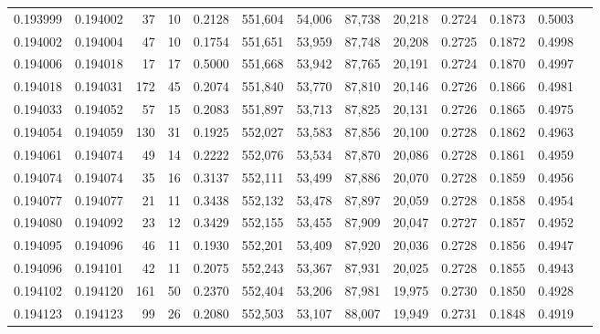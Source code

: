 \begin{tabular}{rrrrrrrrrrrrr}
0.193999 & 0.194002 &    37 &  10 &                                     0.2128 & 551,604 &  54,006 &  87,738 &  20,218 & 0.2724 & 0.1873 & 0.5003 \\
0.194002 & 0.194004 &    47 &  10 &                                     0.1754 & 551,651 &  53,959 &  87,748 &  20,208 & 0.2725 & 0.1872 & 0.4998 \\
0.194006 & 0.194018 &    17 &  17 &                                     0.5000 & 551,668 &  53,942 &  87,765 &  20,191 & 0.2724 & 0.1870 & 0.4997 \\
0.194018 & 0.194031 &   172 &  45 &                                     0.2074 & 551,840 &  53,770 &  87,810 &  20,146 & 0.2726 & 0.1866 & 0.4981 \\
0.194033 & 0.194052 &    57 &  15 &                                     0.2083 & 551,897 &  53,713 &  87,825 &  20,131 & 0.2726 & 0.1865 & 0.4975 \\
0.194054 & 0.194059 &   130 &  31 &                                     0.1925 & 552,027 &  53,583 &  87,856 &  20,100 & 0.2728 & 0.1862 & 0.4963 \\
0.194061 & 0.194074 &    49 &  14 &                                     0.2222 & 552,076 &  53,534 &  87,870 &  20,086 & 0.2728 & 0.1861 & 0.4959 \\
0.194074 & 0.194074 &    35 &  16 &                                     0.3137 & 552,111 &  53,499 &  87,886 &  20,070 & 0.2728 & 0.1859 & 0.4956 \\
0.194077 & 0.194077 &    21 &  11 &                                     0.3438 & 552,132 &  53,478 &  87,897 &  20,059 & 0.2728 & 0.1858 & 0.4954 \\
0.194080 & 0.194092 &    23 &  12 &                                     0.3429 & 552,155 &  53,455 &  87,909 &  20,047 & 0.2727 & 0.1857 & 0.4952 \\
0.194095 & 0.194096 &    46 &  11 &                                     0.1930 & 552,201 &  53,409 &  87,920 &  20,036 & 0.2728 & 0.1856 & 0.4947 \\
0.194096 & 0.194101 &    42 &  11 &                                     0.2075 & 552,243 &  53,367 &  87,931 &  20,025 & 0.2728 & 0.1855 & 0.4943 \\
0.194102 & 0.194120 &   161 &  50 &                                     0.2370 & 552,404 &  53,206 &  87,981 &  19,975 & 0.2730 & 0.1850 & 0.4928 \\
0.194123 & 0.194123 &    99 &  26 &                                     0.2080 & 552,503 &  53,107 &  88,007 &  19,949 & 0.2731 & 0.1848 & 0.4919 \\

\end{tabular}
